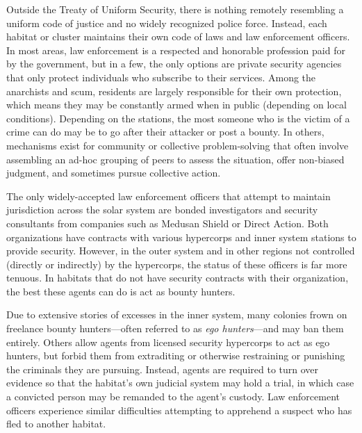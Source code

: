 Outside the Treaty of Uniform Security, there is 
nothing remotely resembling a uniform code of justice and no widely recognized police force. Instead, 
each habitat or cluster maintains their own code of 
laws and law enforcement officers. In most areas, law 
enforcement is a respected and honorable profession 
paid for by the government, but in a few, the only 
options are private security agencies that only protect 
individuals who subscribe to their services. Among 
the anarchists and scum, residents are largely responsible for their own protection, which means they 
may be constantly armed when in public (depending 
on local conditions). Depending on the stations, the 
most someone who is the victim of a crime can do 
may be to go after their attacker or post a bounty. 
In others, mechanisms exist for community or collective problem-solving that often involve assembling an 
ad-hoc grouping of peers to assess the situation, offer 
non-biased judgment, and sometimes pursue collective action.

The only widely-accepted law enforcement officers that attempt to maintain jurisdiction across the 
solar system are bonded investigators and security 
consultants from companies such as Medusan Shield 
or Direct Action. Both organizations have contracts 
with various hypercorps and inner system stations to 
provide security. However, in the outer system and in 
other regions not controlled (directly or indirectly) by 
the hypercorps, the status of these officers is far more 
tenuous. In habitats that do not have security contracts with their organization, the best these agents 
can do is act as bounty hunters.

Due to extensive stories of excesses in the inner 
system, many colonies frown on freelance bounty 
hunters—often referred to as \textit{ego hunters}—and may 
ban them entirely. Others allow agents from licensed 
security hypercorps to act as ego hunters, but forbid 
them from extraditing or otherwise restraining or 
punishing the criminals they are pursuing. Instead, 
agents are required to turn over evidence so that the 
habitat's own judicial system may hold a trial, in 
which case a convicted person may be remanded to 
the agent's custody. Law enforcement officers experience similar difficulties attempting to apprehend a 
suspect who has fled to another habitat.

